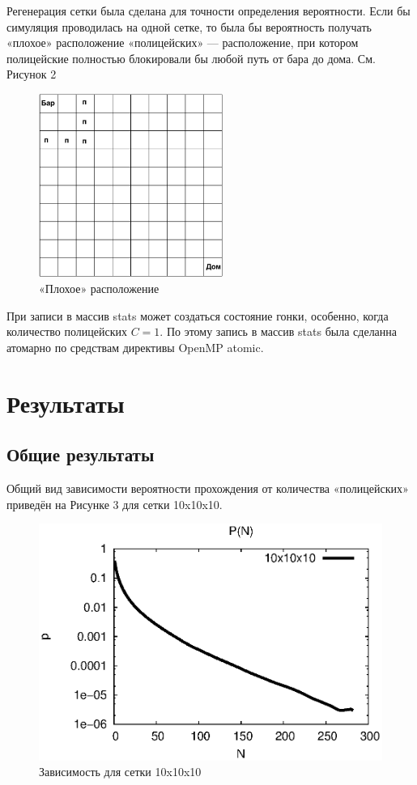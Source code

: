 \documentclass{article}
\begin{document}
    Регенерация сетки была сделана для точности определения вероятности. Если бы симуляция проводилась на одной сетке, то была бы вероятность получать «плохое» расположение «полицейских» — расположение, при котором полицейские полностью блокировали бы любой путь от бара до дома. См. Рисунок 2
    \begin{figure}[ht]
        \centering
        \includegraphics[width=6cm]{pict2.png}
        \caption{«Плохое» расположение}
    \end{figure}


    При записи в массив stats может создаться состояние гонки\cite{wikirc}, особенно, когда количество полицейских $C = 1$. По этому запись в массив stats была сделанна атомарно по средствам директивы OpenMP atomic.
    \pagebreak

    \section{Результаты}
    \subsection{Общие результаты}
    Общий вид зависимости вероятности прохождения от количества «полицейских» приведён на Рисунке 3 для сетки 10x10x10.

    \begin{figure}[ht]
        \centering
        \includegraphics[scale=0.6]{1.eps}
        \caption{Зависимость для сетки 10x10x10}
    \end{figure}
    
\end{document}
